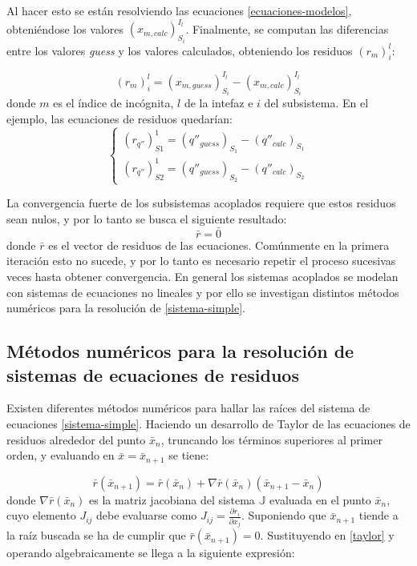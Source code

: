 Al hacer esto se están resolviendo las ecuaciones \ref{ecuaciones-modelos},
obteniéndose los valores $(x_{m,calc})_{S_i}^{I_l}$.
Finalmente, se computan las diferencias entre los valores \textit{guess} y los valores calculados, obteniendo los residuos $(r_m)_{i}^{l}$:

\begin{equation}
(r_m)_{i}^{l} = (x_{m,guess})_{S_i}^{I_l} - (x_{m,calc})_{S_i}^{I_l}
\label{ecuaciones-residuos}
\end{equation}
donde $m$ es el índice de incógnita, $l$ de la intefaz e $i$ del subsistema.
En el ejemplo, las ecuaciones de residuos quedarían:
\begin{equation}
\left\{\begin{matrix}
(r_{q''})_{S1}^{1}  = (q''_{guess})_{S_1} - (q''_{calc})_{S_1} \\
(r_{q''})_{S2}^{1}  = (q''_{guess})_{S_2} - (q''_{calc})_{S_2}
\end{matrix}\right.
\label{res_qq}
\end{equation}

La convergencia fuerte de los subsistemas acoplados requiere que estos residuos sean nulos, y por lo tanto se busca el siguiente resultado:
\begin{equation}
\bar{r}=\bar{0}
\label{sistema-simple}
\end{equation}
donde $\bar{r}$ es el vector de residuos de las ecuaciones.
Comúnmente en la primera iteración esto no sucede, y por lo tanto es necesario repetir el proceso sucesivas veces hasta obtener convergencia.
En general los sistemas acoplados se modelan con sistemas de ecuaciones no lineales y por ello se investigan distintos métodos numéricos para la resolución de \ref{sistema-simple}.

\subsection*{Métodos numéricos para la resolución de sistemas de ecuaciones de residuos}
\label{1:metodos}

Existen diferentes métodos numéricos para hallar las raíces del sistema de ecuaciones \ref{sistema-simple}.
Haciendo un desarrollo de Taylor de las ecuaciones de residuos alrededor del punto $\bar{x}_n$, 
truncando los términos superiores al primer orden, y evaluando en $\bar{x}=\bar{x}_{n+1}$ se tiene:

\begin{equation}
\bar{r}(\bar{x}_{n+1}) = \bar{r}(\bar{x}_n) + \nabla \bar{r}(\bar{x}_n)(\bar{x}_{n+1}-\bar{x}_n)
\label{taylor}
\end{equation}
donde $\nabla \bar{r}(\bar{x}_n)$ es la matriz jacobiana del sistema $\mathbb{J}$ evaluada en el punto $\bar{x}_n$, 
cuyo elemento $J_{ij}$ debe evaluarse como $J_{ij}=\frac{\partial r_i}{\partial x_j}$.
Suponiendo que ${\bar{x}_{n+1}}$ tiende a la raíz buscada se ha de cumplir que $\bar{r}(\bar{x}_{n+1})=0$.
Sustituyendo en \ref{taylor} y operando algebraicamente se llega a la siguiente expresión:

